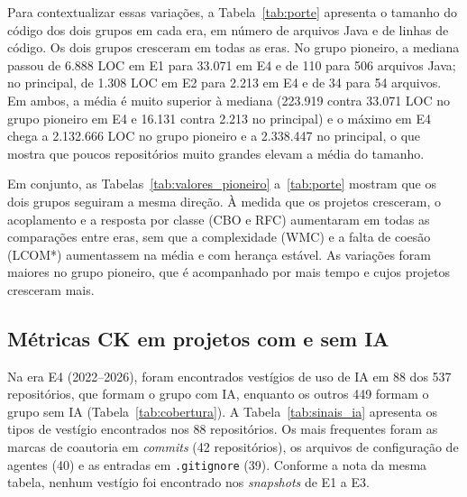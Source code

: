 



Para contextualizar essas variações, a Tabela~\ref{tab:porte} apresenta o tamanho do código dos dois grupos em cada era, em número de arquivos Java e de linhas de código. Os dois grupos cresceram em todas as eras. No grupo pioneiro, a mediana passou de 6.888 LOC em E1 para 33.071 em E4 e de 110 para 506 arquivos Java; no principal, de 1.308 LOC em E2 para 2.213 em E4 e de 34 para 54 arquivos. Em ambos, a média é muito superior à mediana (223.919 contra 33.071 LOC no grupo pioneiro em E4 e 16.131 contra 2.213 no principal) e o máximo em E4 chega a 2.132.666 LOC no grupo pioneiro e a 2.338.447 no principal, o que mostra que poucos repositórios muito grandes elevam a média do tamanho.



Em conjunto, as Tabelas~\ref{tab:valores_pioneiro} a~\ref{tab:porte} mostram que os dois grupos seguiram a mesma direção. À medida que os projetos cresceram, o acoplamento e a resposta por classe (CBO e RFC) aumentaram em todas as comparações entre eras, sem que a complexidade (WMC) e a falta de coesão (LCOM*) aumentassem na média e com herança estável. As variações foram maiores no grupo pioneiro, que é acompanhado por mais tempo e cujos projetos cresceram mais.

\subsection{Métricas CK em projetos com e sem IA}

Na era E4 (2022--2026), foram encontrados vestígios de uso de IA em 88 dos 537 repositórios, que formam o grupo com IA, enquanto os outros 449 formam o grupo sem IA (Tabela~\ref{tab:cobertura}). A Tabela~\ref{tab:sinais_ia} apresenta os tipos de vestígio encontrados nos 88 repositórios. Os mais frequentes foram as marcas de coautoria em \emph{commits} (42 repositórios), os arquivos de configuração de agentes (40) e as entradas em \texttt{.gitignore} (39). Conforme a nota da mesma tabela, nenhum vestígio foi encontrado nos \emph{snapshots} de E1 a E3.



